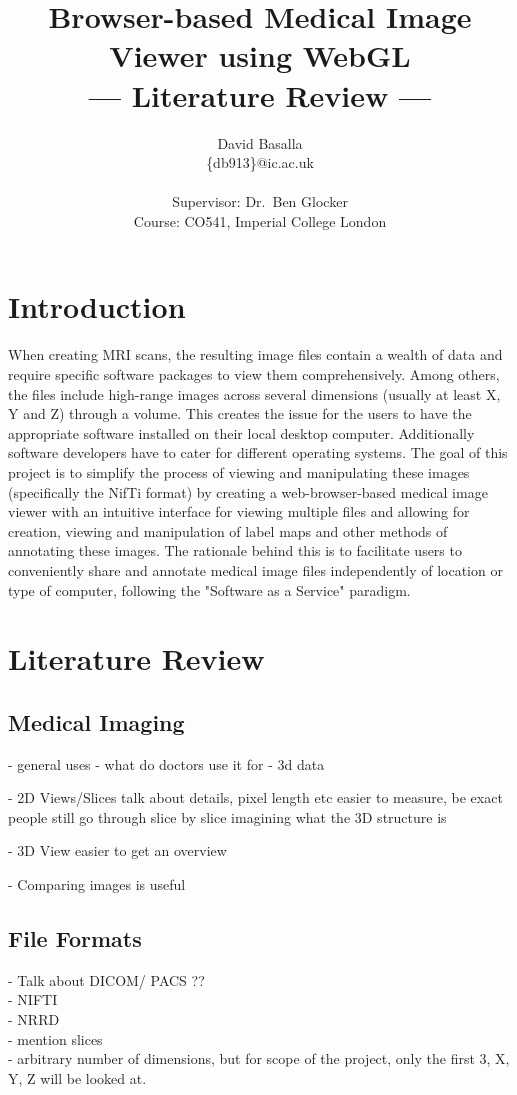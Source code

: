 \documentclass[a4paper,11pt,titlepage]{article}
\title{Browser-based Medical Image Viewer using WebGL \\\Large{--- Literature Review ---}}
\author{David Basalla\\
       \{db913\}@ic.ac.uk\\ \\
       \small{Supervisor: Dr.\ Ben Glocker}\\
       \small{Course: CO541, Imperial College London}
}
\begin{document}
\maketitle

\section{Introduction}
When creating MRI scans, the resulting image files contain a wealth of data and require specific software packages to view them comprehensively. Among others, the files include high-range images across several dimensions (usually at least X, Y and Z) through a volume. This creates the issue for the users to have the appropriate software installed on their local desktop computer. Additionally software developers have to cater for different operating systems. The goal of this project is to simplify the process of viewing and manipulating these images (specifically the NifTi format) by creating a web-browser-based medical image viewer with an intuitive interface for viewing multiple files and allowing for creation, viewing and manipulation of label maps and other methods of annotating these images. The rationale behind this is to facilitate users to conveniently share and annotate medical image files independently of location or type of computer, following the "Software as a Service" paradigm.

\section{Literature Review}

\subsection{Medical Imaging}

- general uses
	- what do doctors use it for
	- 3d data

- 2D Views/Slices
	talk about details, pixel length etc
	easier to measure, be exact
	people still go through slice by slice
	imagining what the 3D structure is

- 3D View
	easier to get an overview
	
- Comparing images is useful	
	
	
	
\subsection{File Formats}
- Talk about DICOM/ PACS ?? \\
- NIFTI\\
- NRRD\\
- mention slices\\
- arbitrary number of dimensions, but for scope of the project, only the first 3, X, Y, Z will be looked at.
\end{document}
